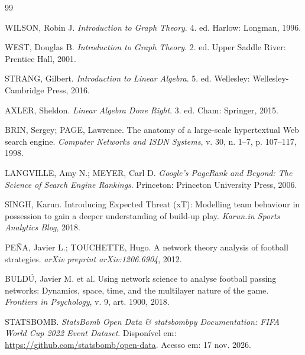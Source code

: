 \documentclass[10pt,a4paper]{article}
\theoremstyle{definition}
\theoremstyle{plain}
\theoremstyle{remark}
\begin{document}
\vspace{0.1cm}
\begin{thebibliography}{99}

WILSON, Robin J. \textit{Introduction to Graph Theory}. 4. ed. Harlow: Longman, 1996.

WEST, Douglas B. \textit{Introduction to Graph Theory}. 2. ed. Upper Saddle River: Prentice Hall, 2001.

STRANG, Gilbert. \textit{Introduction to Linear Algebra}. 5. ed. Wellesley: Wellesley-Cambridge Press, 2016.

AXLER, Sheldon. \textit{Linear Algebra Done Right}. 3. ed. Cham: Springer, 2015.

BRIN, Sergey; PAGE, Lawrence. The anatomy of a large-scale hypertextual Web search engine. \textit{Computer Networks and ISDN Systems}, v. 30, n. 1--7, p. 107--117, 1998.

LANGVILLE, Amy N.; MEYER, Carl D. \textit{Google's PageRank and Beyond: The Science of Search Engine Rankings}. Princeton: Princeton University Press, 2006.

SINGH, Karun. Introducing Expected Threat (xT): Modelling team behaviour in possession to gain a deeper understanding of build-up play. \textit{Karun.in Sports Analytics Blog}, 2018.

PEÑA, Javier L.; TOUCHETTE, Hugo. A network theory analysis of football strategies. \textit{arXiv preprint arXiv:1206.6904}, 2012.

BULDÚ, Javier M. et al. Using network science to analyse football passing networks: Dynamics, space, time, and the multilayer nature of the game. \textit{Frontiers in Psychology}, v. 9, art. 1900, 2018.

STATSBOMB. \textit{StatsBomb Open Data \& statsbombpy Documentation: FIFA World Cup 2022 Event Dataset}. Disponível em: \url{https://github.com/statsbomb/open-data}. Acesso em: 17 nov. 2026.

\end{thebibliography}
\end{document}
